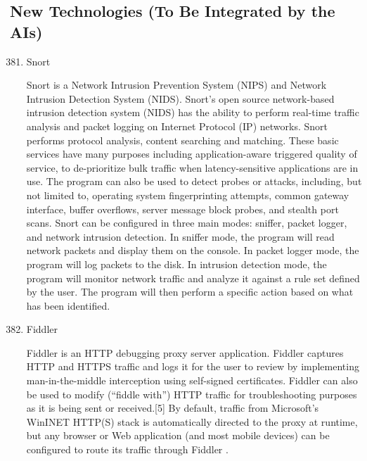 \subsection{New Technologies (To Be Integrated by the AIs)}
\label{\detokenize{i524/technologies:new-technologies-to-be-integrated-by-the-ais}}\label{\detokenize{i524/technologies:new-techs}}\begin{enumerate}
\setcounter{enumi}{380}
\item {} 
Snort

\label{\detokenize{i524/technologies:id692}}{\hyperref[\detokenize{i524/technologies:www-snort}]{\sphinxcrossref{{[}603{]}}}} Snort is a Network Intrusion Prevention System
(NIPS) and Network Intrusion Detection System (NIDS). Snort's
open source network-based intrusion detection system (NIDS) has
the ability to perform real-time traffic analysis and packet
logging on Internet Protocol (IP) networks. Snort performs
protocol analysis, content searching and matching. These basic
services have many purposes including application-aware triggered
quality of service, to de-prioritize bulk traffic when
latency-sensitive applications are in use.  The program can also
be used to detect probes or attacks, including, but not limited
to, operating system fingerprinting attempts, common gateway
interface, buffer overflows, server message block probes, and
stealth port scans.  Snort can be configured in three main modes:
sniffer, packet logger, and network intrusion detection. In
sniffer mode, the program will read network packets and display
them on the console. In packet logger mode, the program will log
packets to the disk. In intrusion detection mode, the program
will monitor network traffic and analyze it against a rule set
defined by the user. The program will then perform a specific
action based on what has been identified.

\item {} 
Fiddler

Fiddler is an HTTP debugging proxy server application. Fiddler
captures HTTP and HTTPS traffic and logs it for the user to
review by implementing man-in-the-middle interception using
self-signed certificates. Fiddler can also be used to modify
(``fiddle with'') HTTP traffic for troubleshooting purposes as it
is being sent or received.{[}5{]} By default, traffic from
Microsoft's WinINET HTTP(S) stack is automatically directed to
the proxy at runtime, but any browser or Web application (and
most mobile devices) can be configured to route its traffic
through Fiddler \label{\detokenize{i524/technologies:id693}}{\hyperref[\detokenize{i524/technologies:www-fiddler}]{\sphinxcrossref{{[}604{]}}}}.


\end{enumerate}
